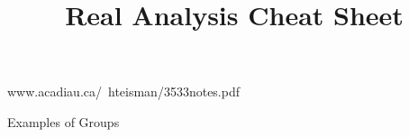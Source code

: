\documentclass[14pt]{extarticle}
\title{Real Analysis Cheat Sheet}
\begin{document}
	\maketitle

	www.acadiau.ca/~hteisman/3533notes.pdf

	\begin{outline}		
		\1	Examples of Groups
	\end{outline}
\end{document}
